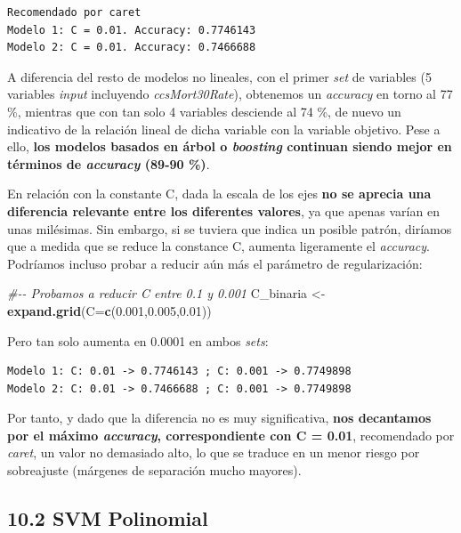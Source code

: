 \documentclass[
]{article}
\newenvironment{Shaded}{\begin{snugshade}}{\end{snugshade}}
\newcommand{\CommentTok}[1]{\textcolor[rgb]{0.56,0.35,0.01}{\textit{#1}}}
\newcommand{\DataTypeTok}[1]{\textcolor[rgb]{0.13,0.29,0.53}{#1}}
\newcommand{\FloatTok}[1]{\textcolor[rgb]{0.00,0.00,0.81}{#1}}
\newcommand{\KeywordTok}[1]{\textcolor[rgb]{0.13,0.29,0.53}{\textbf{#1}}}
\newcommand{\NormalTok}[1]{#1}
\newcommand{\StringTok}[1]{\textcolor[rgb]{0.31,0.60,0.02}{#1}}
\begin{document}
\begin{verbatim}
Recomendado por caret
Modelo 1: C = 0.01. Accuracy: 0.7746143
Modelo 2: C = 0.01. Accuracy: 0.7466688
\end{verbatim}

A diferencia del resto de modelos no lineales, con el primer \emph{set}
de variables (5 variables \emph{input} incluyendo \emph{ccsMort30Rate}),
obtenemos un \emph{accuracy} en torno al 77 \%, mientras que con tan
solo 4 variables desciende al 74 \%, de nuevo un indicativo de la
relación lineal de dicha variable con la variable objetivo. Pese a ello,
\textbf{los modelos basados en árbol o \emph{boosting} continuan siendo
mejor en términos de \emph{accuracy} (89-90 \%)}.

En relación con la constante C, dada la escala de los ejes \textbf{no se
aprecia una diferencia relevante entre los diferentes valores}, ya que
apenas varían en unas milésimas. Sin embargo, si se tuviera que indica
un posible patrón, diríamos que a medida que se reduce la constance C,
aumenta ligeramente el \emph{accuracy}. Podríamos incluso probar a
reducir aún más el parámetro de regularización:

\begin{Shaded}
\begin{Highlighting}[]
\CommentTok{\#{-}{-} Probamos a reducir C entre 0.1 y 0.001}
\NormalTok{C\_binaria <{-}}\StringTok{ }\KeywordTok{expand.grid}\NormalTok{(}\DataTypeTok{C=}\KeywordTok{c}\NormalTok{(}\FloatTok{0.001}\NormalTok{,}\FloatTok{0.005}\NormalTok{,}\FloatTok{0.01}\NormalTok{))}
\end{Highlighting}
\end{Shaded}

Pero tan solo aumenta en 0.0001 en ambos \emph{sets}:

\begin{verbatim}
Modelo 1: C: 0.01 -> 0.7746143 ; C: 0.001 -> 0.7749898
Modelo 2: C: 0.01 -> 0.7466688 ; C: 0.001 -> 0.7749898
\end{verbatim}

Por tanto, y dado que la diferencia no es muy significativa, \textbf{nos
decantamos por el máximo \emph{accuracy}, correspondiente con C = 0.01},
recomendado por \emph{caret}, un valor no demasiado alto, lo que se
traduce en un menor riesgo por sobreajuste (márgenes de separación mucho
mayores).

\hypertarget{svm-polinomial}{%
\subsection{10.2 SVM Polinomial}\label{svm-polinomial}}
\end{document}
